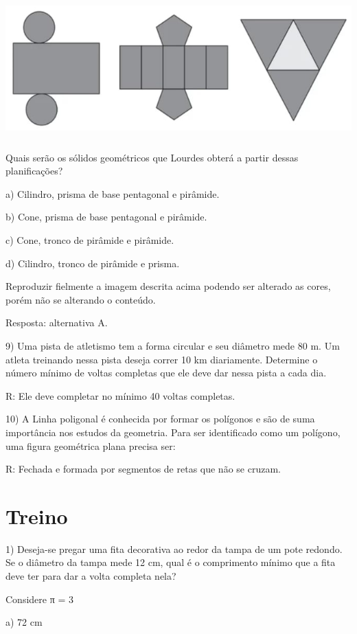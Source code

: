 \includegraphics[width=5.90625in,height=2.125in]{./imgSAEB_6_MAT/media/image51.png}

Quais serão os sólidos geométricos que Lourdes obterá a partir dessas
planificações?

a) Cilindro, prisma de base pentagonal e pirâmide.

b) Cone, prisma de base pentagonal e pirâmide.

c) Cone, tronco de pirâmide e pirâmide.

d) Cilindro, tronco de pirâmide e prisma.

Reproduzir fielmente a imagem descrita acima podendo ser alterado as
cores, porém não se alterando o conteúdo.

Resposta: alternativa A.

9) Uma pista de atletismo tem a forma circular e seu diâmetro mede 80 m.
Um atleta treinando nessa pista deseja correr 10 km diariamente.
Determine o número mínimo de voltas completas que ele deve dar nessa
pista a cada dia.

R: Ele deve completar no mínimo 40 voltas completas.

10) A Linha poligonal é conhecida por formar os polígonos e são de suma
importância nos estudos da geometria. Para ser identificado como um
polígono, uma figura geométrica plana precisa ser:

R: Fechada e formada por segmentos de retas que não se cruzam.

\section{Treino}

1) Deseja-se pregar uma fita decorativa ao redor da tampa de um pote
redondo. Se o diâmetro da tampa mede 12 cm, qual é o comprimento mínimo
que a fita deve ter para dar a volta completa nela?

Considere π = 3

a) 72 cm

